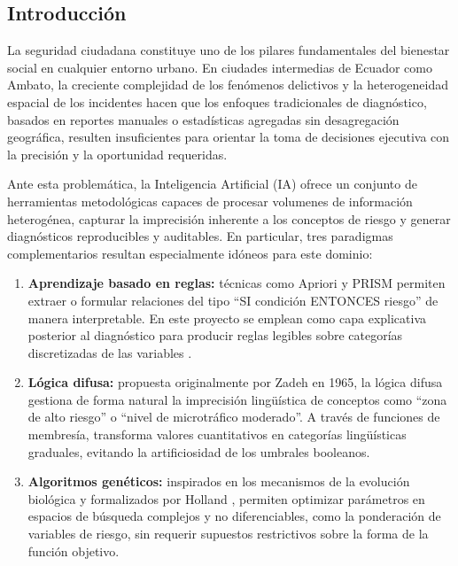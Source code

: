 \documentclass[11pt]{article}
\begin{document}
\subsection{Introducción}

La seguridad ciudadana constituye uno de los pilares fundamentales del bienestar social en cualquier entorno urbano. En ciudades intermedias de Ecuador como Ambato, la creciente complejidad de los fenómenos delictivos y la heterogeneidad espacial de los incidentes hacen que los enfoques tradicionales de diagnóstico, basados en reportes manuales o estadísticas agregadas sin desagregación geográfica, resulten insuficientes para orientar la toma de decisiones ejecutiva con la precisión y la oportunidad requeridas.

Ante esta problemática, la Inteligencia Artificial (IA) ofrece un conjunto de herramientas metodológicas capaces de procesar volume\-nes de información heterogénea, capturar la imprecisión inherente a los conceptos de riesgo y generar diagnósticos reproducibles y auditables. En particular, tres paradigmas complementarios resultan especialmente idóneos para este dominio:

\begin{enumerate}
    \item \textbf{Aprendizaje basado en reglas:} técnicas como Apriori y PRISM permiten extraer o formular relaciones del tipo ``SI condición ENTONCES riesgo'' de manera interpretable. En este proyecto se emplean como capa explicativa posterior al diagnóstico para producir reglas legibles sobre categorías discretizadas de las variables \cite{b4,b5}.
    \item \textbf{Lógica difusa:} propuesta originalmente por Zadeh \cite{b1} en 1965, la lógica difusa gestiona de forma natural la imprecisión lingüística de conceptos como ``zona de alto riesgo'' o ``nivel de microtráfico moderado''. A través de funciones de membresía, transforma valores cuantitativos en categorías lingüísticas graduales, evitando la artificiosidad de los umbrales booleanos.
    \item \textbf{Algoritmos genéticos:} inspirados en los mecanismos de la evolución biológica y formalizados por Holland \cite{b2}, permiten optimizar parámetros en espacios de búsqueda complejos y no diferenciables, como la ponderación de variables de riesgo, sin requerir supuestos restrictivos sobre la forma de la función objetivo.
\end{enumerate}
\end{document}
